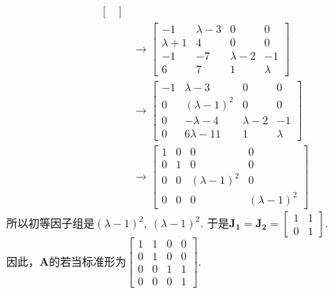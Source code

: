 \documentclass[12pt, a4paper, oneside, fontset=none]{ctexart}
\begin{document}
\begin{enumerate}
\begin{align*}
\begin{bmatrix}
                                       \end{bmatrix}   \\
                                   & \to \begin{bmatrix}
                                             -1          & \lambda - 3 & 0           & 0       \\
                                             \lambda + 1 & 4           & 0           & 0       \\
                                             -1          & -7          & \lambda - 2 & - 1     \\
                                             6           & 7           & 1           & \lambda
                                         \end{bmatrix} \\
                                   & \to \begin{bmatrix}
                                             -1 & \lambda - 3     & 0           & 0       \\
                                             0  & (\lambda - 1)^2 & 0           & 0       \\
                                             0  & -\lambda - 4    & \lambda - 2 & -1      \\
                                             0  & 6\lambda - 11   & 1           & \lambda
                                         \end{bmatrix}      \\
                                   & \to \begin{bmatrix}
                                             1 & 0 & 0               & 0               \\
                                             0 & 1 & 0               & 0               \\
                                             0 & 0 & (\lambda - 1)^2 & 0               \\
                                             0 & 0 & 0               & (\lambda - 1)^2
                                         \end{bmatrix}
        \end{align*}
        所以初等因子组是$(\lambda - 1)^2,\ (\lambda - 1)^2$.
        于是$\bm{J_1} = \bm{J_2} = \begin{bmatrix}
                1 & 1 \\
                0 & 1
            \end{bmatrix}.$ \\
        因此，$\bm{A}$的若当标准形为$\begin{bmatrix}
                1 & 1 & 0 & 0 \\
                0 & 1 & 0 & 0 \\
                0 & 0 & 1 & 1 \\
                0 & 0 & 0 & 1
            \end{bmatrix}.$
\end{enumerate}
\end{document}
